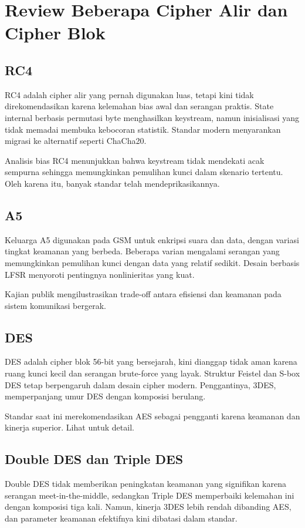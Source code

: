 \documentclass[../main.tex]{subfiles}
\begin{document}
\chapter{Review Beberapa Cipher Alir dan Cipher Blok}

\section{RC4}
RC4 adalah cipher alir yang pernah digunakan luas, tetapi kini tidak direkomendasikan karena kelemahan bias awal dan serangan praktis. State internal berbasis permutasi byte menghasilkan keystream, namun inisialisasi yang tidak memadai membuka kebocoran statistik. Standar modern menyarankan migrasi ke alternatif seperti ChaCha20.

Analisis bias RC4 menunjukkan bahwa keystream tidak mendekati acak sempurna sehingga memungkinkan pemulihan kunci dalam skenario tertentu. Oleh karena itu, banyak standar telah mendeprikasikannya.

\section{A5}
Keluarga A5 digunakan pada GSM untuk enkripsi suara dan data, dengan variasi tingkat keamanan yang berbeda. Beberapa varian mengalami serangan yang memungkinkan pemulihan kunci dengan data yang relatif sedikit. Desain berbasis LFSR menyoroti pentingnya nonlinieritas yang kuat.

Kajian publik mengilustrasikan trade-off antara efisiensi dan keamanan pada sistem komunikasi bergerak.

\section{DES}
DES adalah cipher blok 56-bit yang bersejarah, kini dianggap tidak aman karena ruang kunci kecil dan serangan brute-force yang layak. Struktur Feistel dan S-box DES tetap berpengaruh dalam desain cipher modern. Penggantinya, 3DES, memperpanjang umur DES dengan komposisi berulang.

Standar saat ini merekomendasikan AES sebagai pengganti karena keamanan dan kinerja superior. Lihat \textcite{fips197} untuk detail.

\section{Double DES dan Triple DES}
Double DES tidak memberikan peningkatan keamanan yang signifikan karena serangan meet-in-the-middle, sedangkan Triple DES memperbaiki kelemahan ini dengan komposisi tiga kali. Namun, kinerja 3DES lebih rendah dibanding AES, dan parameter keamanan efektifnya kini dibatasi dalam standar.
\end{document}
